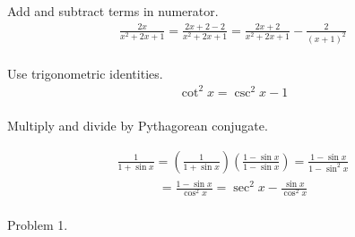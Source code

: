 \documentclass{report}
\begin{document}
Add and subtract terms in numerator.
\begin{align}
	\frac{2 x}{x^2+2 x+1}=\frac{2 x+2-2}{x^2+2 x+1}=\frac{2 x+2}{x^2+2 x+1}-\frac{2}{(x+1)^2} \\
\end{align}

Use trigonometric identities.
\begin{align}
	\cot ^2 x=\csc ^2 x-1 \\
\end{align}

Multiply and divide by Pythagorean conjugate.





\begin{align}
	\frac{1}{1+\sin x}=\left(\frac{1}{1+\sin x}\right)\left(\frac{1-\sin x}{1-\sin x}\right)=\frac{1-\sin x}{1-\sin ^2 x}
\end{align}
\begin{align}
	=\frac{1-\sin x}{\cos ^2 x}=\sec ^2 x-\frac{\sin x}{\cos ^2 x} \\
\end{align}

\qs{}{}
\qs{}{}
\qs{}{}
\qs{}{}

Problem 1. 
\end{document}
